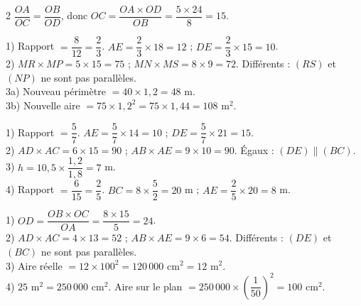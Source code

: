 \begin{multicols}{2}
$\dfrac{OA}{OC}=\dfrac{OB}{OD}$, donc $OC=\dfrac{OA\times OD}{OB}=\dfrac{5\times24}8=15$.

1) Rapport $=\dfrac8{12}=\dfrac23$. $AE=\dfrac23\times18=12$ ; $DE=\dfrac23\times15=10$.\\
2) $MR\times MP=5\times15=75$ ; $MN\times MS=8\times9=72$. Différents : $(RS)$ et $(NP)$
ne sont pas parallèles.\\
3a) Nouveau périmètre $=40\times1{,}2=48$ m.\\
3b) Nouvelle aire $=75\times1{,}2^{2}=75\times1{,}44=108\text{ m}^2$.

1) Rapport $=\dfrac57$. $AE=\dfrac57\times14=10$ ; $DE=\dfrac57\times21=15$.\\
2) $AD\times AC=6\times15=90$ ; $AB\times AE=9\times10=90$. Égaux : $(DE)\parallel(BC)$.\\
3) $h=10{,}5\times\dfrac{1{,}2}{1{,}8}=7$ m.\\
4) Rapport $=\dfrac6{15}=\dfrac25$. $BC=8\times\dfrac52=20$ m ; $AE=\dfrac25\times20=8$ m.

1) $OD=\dfrac{OB\times OC}{OA}=\dfrac{8\times15}5=24$.\\
2) $AD\times AC=4\times13=52$ ; $AB\times AE=9\times6=54$. Différents : $(DE)$ et $(BC)$ ne
sont pas parallèles.\\
3) Aire réelle $=12\times100^{2}=120\,000\text{ cm}^2=12\text{ m}^2$.\\
4) $25\text{ m}^2=250\,000\text{ cm}^2$. Aire sur le plan
$=250\,000\times\left(\dfrac1{50}\right)^{2}=100\text{ cm}^2$.

\end{multicols}
\exercicesBanner
